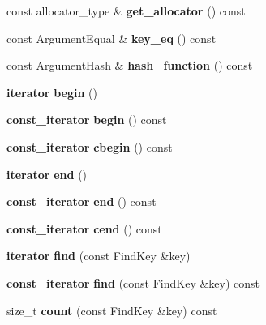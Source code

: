 \begin{DoxyCompactItemize}
\item 
const allocator\+\_\+type \& {\bfseries get\+\_\+allocator} () const \label{classska_1_1detailv3_1_1sherwood__v3__table_a7a839ab56d3a3a4b658139d313a5d96e}

\item 
const Argument\+Equal \& {\bfseries key\+\_\+eq} () const \label{classska_1_1detailv3_1_1sherwood__v3__table_a5c03df7a5c53d4d1370650071b903753}

\item 
const Argument\+Hash \& {\bfseries hash\+\_\+function} () const \label{classska_1_1detailv3_1_1sherwood__v3__table_a7297e9096c61b4f7eb62d208f68954f4}

\item 
{\bf iterator} {\bfseries begin} ()\label{classska_1_1detailv3_1_1sherwood__v3__table_a1a10add3f012ca6b718e77e22b1a566e}

\item 
{\bf const\+\_\+iterator} {\bfseries begin} () const \label{classska_1_1detailv3_1_1sherwood__v3__table_a0ef070b8634cd1bae3d22b2b461042ad}

\item 
{\bf const\+\_\+iterator} {\bfseries cbegin} () const \label{classska_1_1detailv3_1_1sherwood__v3__table_a4c2d0f8ecdecde9d53fe8c41b201508e}

\item 
{\bf iterator} {\bfseries end} ()\label{classska_1_1detailv3_1_1sherwood__v3__table_a85d44a1eb013c5aadd40c12085c096b4}

\item 
{\bf const\+\_\+iterator} {\bfseries end} () const \label{classska_1_1detailv3_1_1sherwood__v3__table_a70539c3fc38253b7422d87194eb84ee1}

\item 
{\bf const\+\_\+iterator} {\bfseries cend} () const \label{classska_1_1detailv3_1_1sherwood__v3__table_afc653322e9d63349f0009052a8b22887}

\item 
{\bf iterator} {\bfseries find} (const Find\+Key \&key)\label{classska_1_1detailv3_1_1sherwood__v3__table_a4f77659654fc9b95f780d631fcb8ba3c}

\item 
{\bf const\+\_\+iterator} {\bfseries find} (const Find\+Key \&key) const \label{classska_1_1detailv3_1_1sherwood__v3__table_a3f03b08e81232765292c8b5938816256}

\item 
size\+\_\+t {\bfseries count} (const Find\+Key \&key) const \label{classska_1_1detailv3_1_1sherwood__v3__table_a722d57e22f121bab592d749f29f1bc7b}


\end{DoxyCompactItemize}
